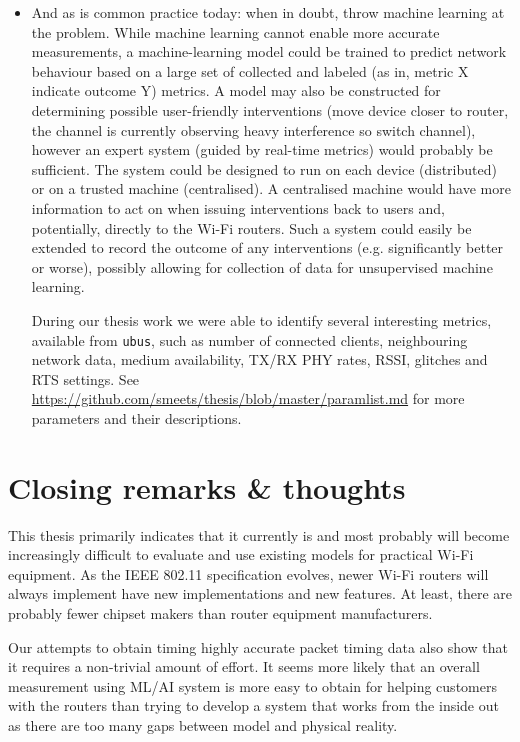 \begin{itemize}
\item And as is common practice today: when in doubt, throw machine learning
at the problem. While machine learning cannot enable more accurate
measurements, a machine-learning model could be trained to predict network
behaviour based on a large set of collected and labeled (as in, metric X
indicate outcome Y) metrics. A model may also be constructed for determining
possible user-friendly interventions (move device closer to router, the
channel is currently observing heavy interference so switch channel), however
an expert system (guided by real-time metrics) would probably be sufficient.
The system could be designed to run on each device (distributed) or on a
trusted machine (centralised). A centralised machine would have more
information to act on when issuing interventions back to users and,
potentially, directly to the Wi-Fi routers. Such a system could easily be
extended to record the outcome of any interventions (e.g. significantly
better or worse), possibly allowing for collection of data for unsupervised
machine learning.

During our thesis work we were able to identify several interesting metrics, available from \texttt{ubus}, such as number of connected clients, neighbouring
network data, medium availability, TX/RX PHY rates, RSSI, glitches and RTS settings. See \url{https://github.com/smeets/thesis/blob/master/paramlist.md} for more
parameters and their descriptions.


\end{itemize}

\section{Closing remarks \& thoughts}
This thesis primarily indicates that it currently is and most probably will become increasingly difficult to evaluate and use existing
models for practical Wi-Fi equipment. As the IEEE 802.11 specification evolves, newer Wi-Fi routers will always implement have new implementations and new features. At least, there are probably fewer chipset makers than router equipment
manufacturers.

Our attempts to obtain timing highly accurate packet timing data also show
that it requires a non-trivial amount of effort. It seems more likely that
an overall measurement using ML/AI system is more easy to obtain for helping
customers with the routers than trying to develop a system that works from the
inside out as there are too many gaps between model and physical reality.
